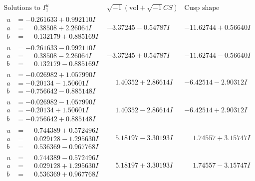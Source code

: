\documentclass[1p]{elsarticle_modified}
\theoremstyle{definition}
\newcommand{\I}{\sqrt{-1}}
\begin{document}
$$\begin{array}{c|c|c}  
\text{Solutions to }I^u_{1}& \I (\text{vol} + \sqrt{-1}CS) & \text{Cusp shape}\\
 \hline 
\begin{aligned}
u &= -0.261633 + 0.992110 I \\
a &= \phantom{-}0.38508 + 2.26064 I \\
b &= \phantom{-}0.132179 + 0.885169 I\end{aligned}
 & -3.37245 - 0.54787 I & -11.62744 + 0.56640 I \\ \hline\begin{aligned}
u &= -0.261633 - 0.992110 I \\
a &= \phantom{-}0.38508 - 2.26064 I \\
b &= \phantom{-}0.132179 - 0.885169 I\end{aligned}
 & -3.37245 + 0.54787 I & -11.62744 - 0.56640 I \\ \hline\begin{aligned}
u &= -0.026982 + 1.057990 I \\
a &= -0.20134 - 1.50601 I \\
b &= -0.756642 - 0.885148 I\end{aligned}
 & \phantom{-}1.40352 + 2.86614 I & -6.42514 - 2.90312 I \\ \hline\begin{aligned}
u &= -0.026982 - 1.057990 I \\
a &= -0.20134 + 1.50601 I \\
b &= -0.756642 + 0.885148 I\end{aligned}
 & \phantom{-}1.40352 - 2.86614 I & -6.42514 + 2.90312 I \\ \hline\begin{aligned}
u &= \phantom{-}0.744389 + 0.572496 I \\
a &= \phantom{-}0.029128 - 1.295630 I \\
b &= \phantom{-}0.536369 - 0.967768 I\end{aligned}
 & \phantom{-}5.18197 - 3.30193 I & \phantom{-}1.74557 + 3.15747 I \\ \hline\begin{aligned}
u &= \phantom{-}0.744389 - 0.572496 I \\
a &= \phantom{-}0.029128 + 1.295630 I \\
b &= \phantom{-}0.536369 + 0.967768 I\end{aligned}
 & \phantom{-}5.18197 + 3.30193 I & \phantom{-}1.74557 - 3.15747 I \\ \hline\begin{aligned}

\end{aligned}
\end{array}$$
\end{document}

